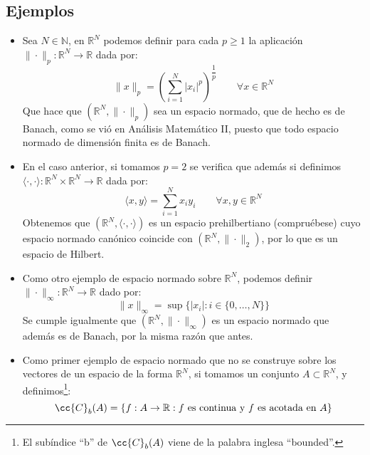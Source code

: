 \subsection{Ejemplos}
\begin{itemize}
    \item Sea $N\in \mathbb{N}$, en $\mathbb{R}^N$ podemos definir para cada $p\geq 1$ la aplicación\newline $\|\cdot \|_p:\mathbb{R}^N\to \mathbb{R}$ dada por:
        \begin{equation*}
            \|x\|_p = {\left(\sum_{i=1}^{N}|x_i|^p\right)}^{\dfrac{1}{p}} \qquad \forall x\in \mathbb{R}^N
        \end{equation*}
        Que hace que $(\mathbb{R}^N, \|\cdot \|_p)$ sea un espacio normado, que de hecho es de Banach, como se vió en Análisis Matemático II, puesto que todo espacio normado de dimensión finita es de Banach.
    \item En el caso anterior, si tomamos $p=2$ se verifica que además si definimos $\langle \cdot ,\cdot  \rangle :\mathbb{R}^N\times \mathbb{R}^N\to \mathbb{R}$ dada por:
        \begin{equation*}
            \langle x,y \rangle  = \sum_{i=1}^{N} x_iy_i \qquad \forall x,y\in \mathbb{R}^N
        \end{equation*}
        Obtenemos que $(\mathbb{R}^N,\langle \cdot ,\cdot  \rangle )$ es un espacio prehilbertiano (compruébese) cuyo espacio normado canónico coincide con $(\mathbb{R}^N,\|\cdot \|_2)$, por lo que es un espacio de Hilbert.
    \item Como otro ejemplo de espacio normado sobre $\mathbb{R}^N$, podemos definir $\|\cdot \|_\infty:\mathbb{R}^N\to \mathbb{R}$ dado por:
        \begin{equation*}
            \|x\|_\infty = \sup \{|x_i| : i \in \{0,\ldots, N\}\}
        \end{equation*}
        Se cumple igualmente que $(\mathbb{R}^N,\|\cdot \|_\infty)$ es un espacio normado que además es de Banach, por la misma razón que antes.
    \item Como primer ejemplo de espacio normado que no se construye sobre los vectores de un espacio de la forma $\mathbb{R}^N$, si tomamos un conjunto $A\subset \mathbb{R}^N$, y definimos\footnote{El subíndice ``b'' de $\cc{C}_b(A)$ viene de la palabra inglesa ``bounded''.}:
        \begin{equation*}
            \cc{C}_b(A) = \{f:A\to \mathbb{R} : f \text{\ es continua y } f \text{\ es acotada en\ } A\}
        \end{equation*}

\end{itemize}
